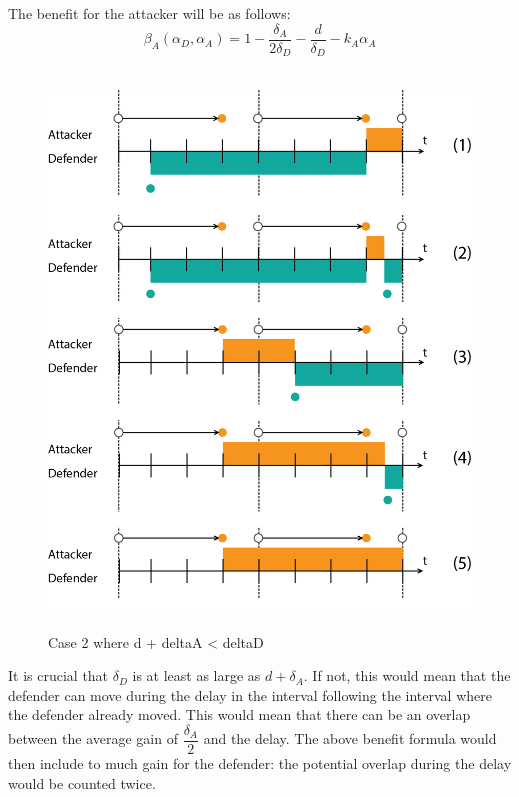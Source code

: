 \documentclass[master=cws, masteroption=vs]{kulemt}
\begin{document}
\begin{abstract*}
The benefit for the attacker will be as follows:
\begin{equation}\label{first}
\beta_{A}(\alpha_{D},\alpha_{A}) = 1 -\dfrac{\delta_{A}}{2\delta_{D}} - \dfrac{d}{\delta_{D}} - k_{A} \alpha_{A} 
\end{equation}\\

\begin{figure}[hbtp]
\caption{Case 2 where d + deltaA < deltaD}
\centering
\includegraphics[scale=0.5]{../../doc/template/Images/FlipItCase2.png}
\label{fig:case2}
\end{figure}


It is crucial that $ \delta_{D}$ is at least as large as $d + \delta_{A}$. If not, this would mean that the defender can move during the delay in the interval following the interval where the defender already moved. This would mean that there can be an overlap between the average gain of $\dfrac{\delta_{A}}{2}$ and the delay. The above benefit formula would then include to much gain for the defender: the potential overlap during the delay would be counted twice. \\



\end{abstract*}
\end{document}
